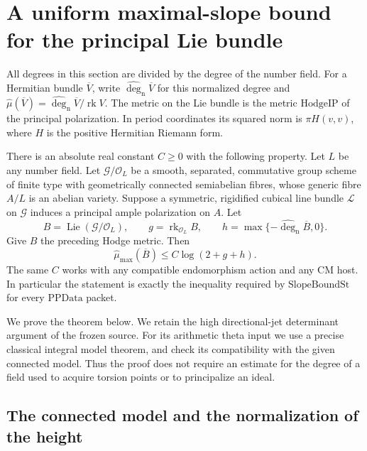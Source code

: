 \section{A uniform maximal-slope bound for the principal Lie bundle}
\label{sec:sr-general-principal-slope}

All degrees in this section are divided by the
degree of the number field.
For a Hermitian bundle \(\overline V\), write
\(\widehat{\deg}_{\mathrm n}\overline V\) for this
normalized degree and
\(\widehat\mu(\overline V)=
\widehat{\deg}_{\mathrm n}\overline V/\operatorname{rk}V\).
The metric on the Lie bundle is the metric
\(\mathrm{HodgeIP}\) of the principal polarization.
In period coordinates its squared norm is
\(\pi H(v,v)\), where \(H\) is the positive
Hermitian Riemann form.

\begin{srtheorem}\label{thm:sr-general-principal-slope}
There is an absolute real constant \(C\ge0\)
with the following property.
Let \(L\) be any number field.
Let \(\mathcal G/\mathcal O_L\) be a smooth,
separated, commutative group scheme of finite
type with geometrically connected semiabelian
fibres, whose generic fibre \(A/L\) is an
abelian variety.
Suppose a symmetric, rigidified cubical line
bundle \(\mathcal L\) on \(\mathcal G\) induces
a principal ample polarization on \(A\).
Let
\[
 B=\operatorname{Lie}(\mathcal G/\mathcal O_L),
 \qquad g=\operatorname{rk}_{\mathcal O_L}B,
 \qquad
 h=\max\{-\widehat{\deg}_{\mathrm n}\overline B,0\}.
\]
Give \(B\) the preceding Hodge metric.
Then
\[
 \widehat\mu_{\max}(\overline B)
           \le C\log(2+g+h).                         \tag{SB1}
\]
The same \(C\) works with any compatible
endomorphism action and any CM host.
In particular the statement is exactly the
inequality required by \(\mathrm{SlopeBoundSt}\)
for every \(\mathrm{PPData}\) packet.
\end{srtheorem}

We prove the theorem below.
We retain the high directional-jet determinant
argument of the frozen source.
For its arithmetic theta input we use a
precise classical integral model theorem,
and check its compatibility with the given
connected model.
Thus the proof does not require an estimate
for the degree of a field used to acquire
torsion points or to principalize an ideal.

\subsection{The connected model and the normalization of the height}

